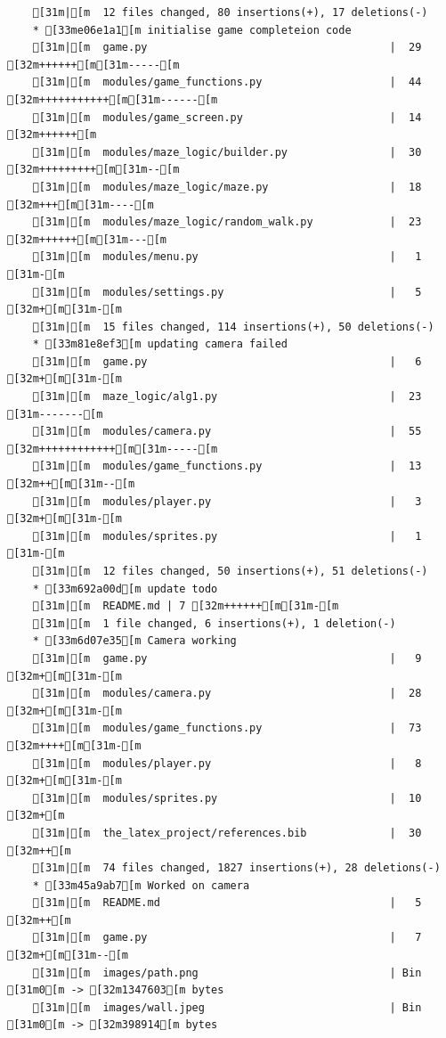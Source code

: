 \documentclass{article}
\begin{document}
{\begin{verbatim}
    [31m|[m  12 files changed, 80 insertions(+), 17 deletions(-)
    * [33me06e1a1[m initialise game completeion code
    [31m|[m  game.py                                      |  29 [32m++++++[m[31m-----[m
    [31m|[m  modules/game_functions.py                    |  44 [32m+++++++++++[m[31m------[m
    [31m|[m  modules/game_screen.py                       |  14 [32m++++++[m
    [31m|[m  modules/maze_logic/builder.py                |  30 [32m+++++++++[m[31m--[m
    [31m|[m  modules/maze_logic/maze.py                   |  18 [32m+++[m[31m----[m
    [31m|[m  modules/maze_logic/random_walk.py            |  23 [32m++++++[m[31m---[m
    [31m|[m  modules/menu.py                              |   1 [31m-[m
    [31m|[m  modules/settings.py                          |   5 [32m+[m[31m-[m
    [31m|[m  15 files changed, 114 insertions(+), 50 deletions(-)
    * [33m81e8ef3[m updating camera failed
    [31m|[m  game.py                                      |   6 [32m+[m[31m-[m
    [31m|[m  maze_logic/alg1.py                           |  23 [31m-------[m
    [31m|[m  modules/camera.py                            |  55 [32m++++++++++++[m[31m-----[m
    [31m|[m  modules/game_functions.py                    |  13 [32m++[m[31m--[m
    [31m|[m  modules/player.py                            |   3 [32m+[m[31m-[m
    [31m|[m  modules/sprites.py                           |   1 [31m-[m
    [31m|[m  12 files changed, 50 insertions(+), 51 deletions(-)
    * [33m692a00d[m update todo
    [31m|[m  README.md | 7 [32m++++++[m[31m-[m
    [31m|[m  1 file changed, 6 insertions(+), 1 deletion(-)
    * [33m6d07e35[m Camera working
    [31m|[m  game.py                                      |   9 [32m+[m[31m-[m
    [31m|[m  modules/camera.py                            |  28 [32m+[m[31m-[m
    [31m|[m  modules/game_functions.py                    |  73 [32m++++[m[31m-[m
    [31m|[m  modules/player.py                            |   8 [32m+[m[31m-[m
    [31m|[m  modules/sprites.py                           |  10 [32m+[m
    [31m|[m  the_latex_project/references.bib             |  30 [32m++[m
    [31m|[m  74 files changed, 1827 insertions(+), 28 deletions(-)
    * [33m45a9ab7[m Worked on camera
    [31m|[m  README.md                                    |   5 [32m++[m
    [31m|[m  game.py                                      |   7 [32m+[m[31m--[m
    [31m|[m  images/path.png                              | Bin [31m0[m -> [32m1347603[m bytes
    [31m|[m  images/wall.jpeg                             | Bin [31m0[m -> [32m398914[m bytes

\end{verbatim}}
\end{document}
